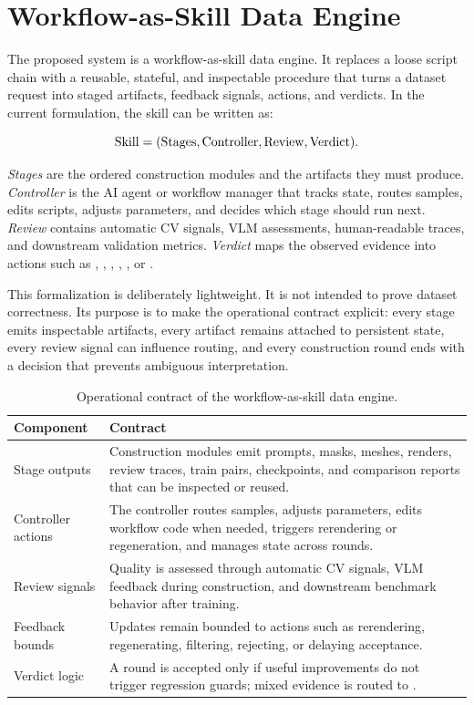 \section{Workflow-as-Skill Data Engine}
\label{sec:workflow}

The proposed system is a workflow-as-skill data engine. It replaces a loose script chain with a reusable, stateful, and inspectable procedure that turns a dataset request into staged artifacts, feedback signals, actions, and verdicts. In the current formulation, the skill can be written as:

\begin{equation}
\label{eq:skill}
\mathrm{Skill}=(\mathrm{Stages},\mathrm{Controller},\mathrm{Review},\mathrm{Verdict}).
\end{equation}

\emph{Stages} are the ordered construction modules and the artifacts they must produce. \emph{Controller} is the AI agent or workflow manager that tracks state, routes samples, edits scripts, adjusts parameters, and decides which stage should run next. \emph{Review} contains automatic CV signals, VLM assessments, human-readable traces, and downstream validation metrics. \emph{Verdict} maps the observed evidence into actions such as \continueverdict{}, \inspect{}, \regenerate{}, \rejectverdict{}, \stoporrevert{}, or \nosignal{}.

This formalization is deliberately lightweight. It is not intended to prove dataset correctness. Its purpose is to make the operational contract explicit: every stage emits inspectable artifacts, every artifact remains attached to persistent state, every review signal can influence routing, and every construction round ends with a decision that prevents ambiguous interpretation.

\begin{table}[t]
\centering
\small
\caption{Operational contract of the workflow-as-skill data engine.}
\label{tab:operational-contract}
\begin{tabularx}{\linewidth}{lX}
\toprule
Component & Contract \\
\midrule
Stage outputs & Construction modules emit prompts, masks, meshes, renders, review traces, train pairs, checkpoints, and comparison reports that can be inspected or reused. \\
Controller actions & The controller routes samples, adjusts parameters, edits workflow code when needed, triggers rerendering or regeneration, and manages state across rounds. \\
Review signals & Quality is assessed through automatic CV signals, VLM feedback during construction, and downstream benchmark behavior after training. \\
Feedback bounds & Updates remain bounded to actions such as rerendering, regenerating, filtering, rejecting, or delaying acceptance. \\
Verdict logic & A round is accepted only if useful improvements do not trigger regression guards; mixed evidence is routed to \inspect{}. \\
\bottomrule
\end{tabularx}
\end{table}

